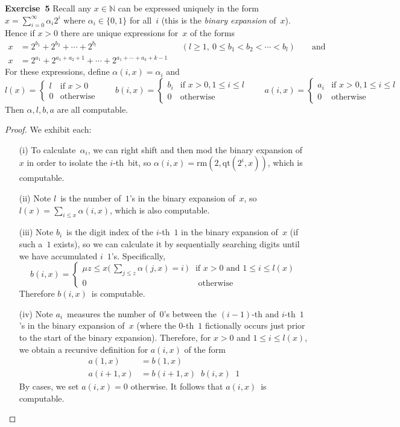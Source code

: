 \documentclass[letterpaper]{article}
\newcommand{\exercise}[2][]{\noindent\textbf{Exercise~{#2}}\ifthenelse{\isempty{#1}}{\textbf{.}}{ ({#1})\textbf{.}}}
\newcommand{\N}{\mathbb{N}}
\newcommand{\tminus}{\mathop{\overset{.}{-}}}
\newcommand{\qt}{\mathrm{qt}}
\renewcommand{\rm}{\mathrm{rm}}
\theoremstyle{plain}
\theoremstyle{definition}
\theoremstyle{remark}
\begin{document}
\exercise{5}
Recall any $x\in\N$ can be expressed uniquely in the form $x=\sum_{i=0}^\infty\alpha_i2^i$ where $\alpha_i\in\{0,1\}$ for all~$i$ (this is the \emph{binary expansion} of~$x$). Hence if $x>0$ there are unique expressions for~$x$ of the forms
\begin{align*}
x&=2^{b_1}+2^{b_2}+\cdots+2^{b_l}&&(l\ge1,\ 0\le b_1<b_2<\cdots<b_l)&&\text{ and}\\
x&=2^{a_1}+2^{a_1+a_2+1}+\cdots+2^{a_1+\cdots+a_k+k-1}&&&&
\end{align*}
\noindent For these expressions, define $\alpha(i,x)=\alpha_i$ and
$$l(x)=\begin{cases}
l&\text{if }x>0\\
0&\text{otherwise}
\end{cases}
\qquad
b(i,x)=\begin{cases}
b_i&\text{if }x>0,1\le i\le l\\
0&\text{otherwise}
\end{cases}
\qquad
a(i,x)=\begin{cases}
a_i&\text{if }x>0,1\le i\le l\\
0&\text{otherwise}
\end{cases}$$
Then $\alpha,l,b,a$ are all computable.
\begin{proof}
We exhibit each:
\begin{enumerate}[itemsep=0pt]
\item[(i)] To calculate~$\alpha_i$, we can right shift and then mod the binary expansion of~$x$ in order to isolate the $i$-th~bit, so $\alpha(i,x)=\rm(2,\qt(2^i,x))$, which is computable.
\item[(ii)] Note $l$~is the number of~$1$'s in the binary expansion of~$x$, so $l(x)=\sum_{i\le x}\alpha(i,x)$, which is also computable.
\item[(iii)] Note $b_i$~is the digit index of the $i$-th~$1$ in the binary expansion of~$x$ (if such a~$1$ exists), so we can calculate it by sequentially searching digits until we have accumulated $i$~$1$'s. Specifically,
$$b(i,x)=\begin{cases}
\mu z\le x\bigl(\,\sum_{j\le z}\alpha(j,x)=i\,\bigl)&\text{if }x>0\text{ and }1\le i\le l(x)\\
0&\text{ otherwise}
\end{cases}$$
Therefore $b(i,x)$~is computable.
\item[(iv)] Note $a_i$~measures the number of~$0$'s between the $(i-1)$-th and $i$-th~$1$'s in the binary expansion of~$x$ (where the $0$-th~$1$ fictionally occurs just prior to the start of the binary expansion). Therefore, for $x>0$ and $1\le i\le l(x)$, we obtain a recursive definition for $a(i,x)$ of the form
\begin{align*}
a(1,x)&=b(1,x)\\
a(i+1,x)&=b(i+1,x)\tminus b(i,x)\tminus 1
\end{align*}
By cases, we set $a(i,x)=0$ otherwise. It follows that $a(i,x)$~is computable.
\end{enumerate}
\end{proof}
\end{document}
